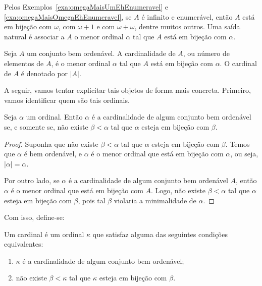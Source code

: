 Pelos Exemplos~\ref{exa:omegaMaisUmEhEnumeravel} e \ref{exa:omegaMaisOmegaEhEnumeravel}, se $A$ é infinito e enumerável, então $A$ está em bijeção com $\omega$, com $\omega+1$ e com $\omega+\omega$, dentre muitos outros.
Uma saída natural é associar a $A$ o menor ordinal $\alpha$ tal que $A$ está em bijeção com $\alpha$.

\begin{definition}\label{def:cardinalidadeDeConjuntoBemOrdenavel}
    Seja $A$ um conjunto bem ordenável.
    A cardinalidade de $A$, ou número de elementos de $A$, é o menor ordinal $\alpha$ tal que $A$ está em bijeção com $\alpha$.
    O cardinal de $A$ é denotado por $|A|$.
\end{definition}

A seguir, vamos tentar explicitar tais objetos de forma mais concreta.
Primeiro, vamos identificar quem são tais ordinais.

\begin{lemma}\label{lem:ordinaisQueSaoCardinalidades}
    Seja $\alpha$ um ordinal.
    Então $\alpha$ é a cardinalidade de algum conjunto bem ordenável se, e somente se, não existe $\beta<\alpha$ tal que $\alpha$ esteja em bijeção com $\beta$.
\end{lemma}
\begin{proof}
    Suponha que não existe $\beta<\alpha$ tal que $\alpha$ esteja em bijeção com $\beta$.
    Temos que $\alpha$ é bem ordenável, e $\alpha$ é o menor ordinal que está em bijeção com $\alpha$, ou seja, $|\alpha|=\alpha$.

    Por outro lado, se $\alpha$ é a cardinalidade de algum conjunto bem ordenável $A$, então $\alpha$ é o menor ordinal que está em bijeção com $A$.
    Logo, não existe $\beta<\alpha$ tal que $\alpha$ esteja em bijeção com $\beta$, pois tal $\beta$ violaria a minimalidade de $\alpha$.
\end{proof}

Com isso, define-se:

\begin{definition}\label{def:cardinal}
    Um cardinal é um ordinal $\kappa$ que satisfaz alguma das seguintes condições equivalentes:
    \begin{enumerate}[label=(\roman*)]
    \item $\kappa$ é a cardinalidade de algum conjunto bem ordenável;
    \item não existe $\beta<\kappa$ tal que $\kappa$ esteja em bijeção com $\beta$.
    \end{enumerate}
\end{definition}

